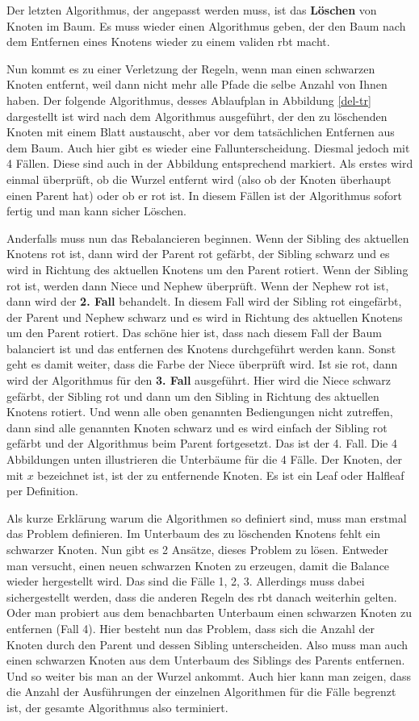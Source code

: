 \documentclass[11pt]{article}
\begin{document}
Der letzten Algorithmus, der angepasst werden muss, ist das \textbf{Löschen} von Knoten im Baum. Es muss wieder einen Algorithmus geben, 
der den Baum nach dem Entfernen eines Knotens wieder zu einem validen \gls{rbt} macht. 

Nun kommt es zu einer Verletzung der Regeln, wenn man einen schwarzen Knoten entfernt, weil dann nicht mehr alle Pfade die selbe Anzahl von Ihnen haben. Der folgende Algorithmus, desses Ablaufplan in Abbildung \ref{del-tr} dargestellt ist wird nach dem Algorithmus ausgeführt,
der den zu löschenden Knoten mit einem Blatt austauscht, aber vor dem tatsächlichen Entfernen aus dem Baum.
Auch hier gibt es wieder eine Fallunterscheidung. Diesmal jedoch mit 4 Fällen. Diese sind auch in der Abbildung entsprechend markiert.
Als erstes wird einmal überprüft, ob die Wurzel entfernt wird (also ob der Knoten überhaupt einen Parent hat) oder ob er rot ist. In diesem Fällen ist der Algorithmus sofort fertig und man kann sicher Löschen.

Anderfalls muss nun das Rebalancieren beginnen. Wenn der Sibling des aktuellen Knotens rot ist, dann wird der Parent rot gefärbt, der Sibling schwarz und es wird in Richtung des aktuellen Knotens um den Parent rotiert.
Wenn der Sibling rot ist, werden dann Niece und Nephew überprüft.
Wenn der Nephew rot ist, dann wird der \textbf{2. Fall} behandelt. In diesem Fall wird der Sibling rot eingefärbt, der Parent und Nephew schwarz und es wird in Richtung des aktuellen Knotens um den Parent rotiert.
Das schöne hier ist, dass nach diesem Fall der Baum balanciert ist und das entfernen des Knotens durchgeführt werden kann.
Sonst geht es damit weiter, dass die Farbe der Niece überprüft wird. Ist sie rot, dann wird der Algorithmus für den \textbf{3. Fall} ausgeführt. Hier wird die Niece schwarz gefärbt, der Sibling rot und dann um den Sibling in Richtung des aktuellen Knotens rotiert.
Und wenn alle oben genannten Bediengungen nicht zutreffen, dann sind alle genannten Knoten schwarz und es wird einfach der Sibling rot gefärbt und der Algorithmus beim Parent fortgesetzt. Das ist der 4. Fall.
Die 4 Abbildungen unten illustrieren die Unterbäume für die 4 Fälle. Der Knoten, der mit $x$ bezeichnet ist, ist der zu entfernende Knoten. Es ist ein Leaf oder Halfleaf per Definition. 

Als kurze Erklärung warum die Algorithmen so definiert sind, muss man erstmal das Problem definieren. Im Unterbaum des zu löschenden Knotens fehlt ein schwarzer Knoten. Nun gibt es 2 Ansätze, dieses Problem zu lösen. Entweder man versucht, 
einen neuen schwarzen Knoten zu erzeugen, damit die Balance wieder hergestellt wird. Das sind die Fälle 1, 2, 3. Allerdings muss dabei sichergestellt werden, dass die anderen Regeln des \gls{rbt} danach weiterhin gelten. Oder man probiert aus dem benachbarten Unterbaum einen schwarzen Knoten zu entfernen (Fall 4).
Hier besteht nun das Problem, dass sich die Anzahl der Knoten durch den Parent und dessen Sibling unterscheiden. Also muss man auch einen schwarzen Knoten aus dem Unterbaum des Siblings des Parents entfernen. Und so weiter bis man an der Wurzel ankommt.  
Auch hier kann man zeigen, dass die Anzahl der Ausführungen der einzelnen Algorithmen für die Fälle begrenzt ist, der gesamte Algorithmus also terminiert.
\end{document}
